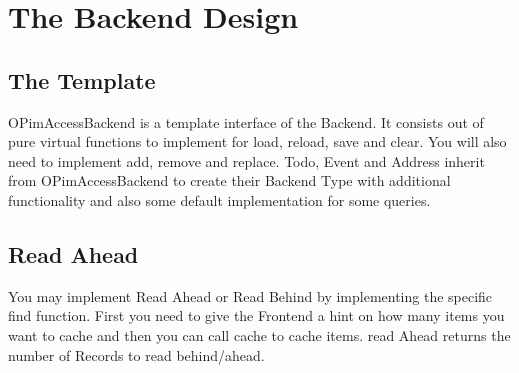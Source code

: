 \section{The Backend Design}

\subsection{The Template}
OPimAccessBackend is a template interface of the Backend. 
It consists out of pure virtual functions to implement for
load, reload, save and clear. You will also need to implement
add, remove and replace.
Todo, Event and Address inherit from OPimAccessBackend to create
their Backend Type with additional functionality and also some
default implementation for some queries.

\subsection{Read Ahead}
You may implement Read Ahead or Read Behind by implementing
the specific find function. First you need to give the Frontend
a hint on how many items you want to cache and then you can call
cache to cache items.
read Ahead returns the number of Records to read behind/ahead.
